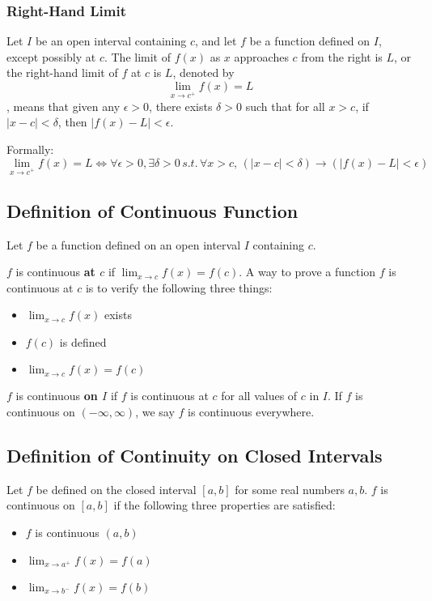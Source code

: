 \documentclass[12pt]{article}
\begin{document}
\subsubsection{Right-Hand Limit}
Let $I$ be an open interval containing $c$, and let $f$ be a function defined on $I$, except possibly at $c$. The limit of $f(x)$ as $x$ approaches $c$ from the right is $L$, or the right-hand limit of $f$ at $c$ is $L$, denoted by $$\lim_{x \rightarrow c^+} f(x) = L$$, means that given any $\epsilon > 0$, there exists $\delta > 0$ such that for all $x > c$, if $|x - c| < \delta$, then $|f(x) - L| < \epsilon$. 

Formally: $$\lim_{x \rightarrow c^+}f(x) = L \Longleftrightarrow \forall \epsilon > 0, \exists \delta > 0 \, s.t. \, \forall x > c, \, (|x-c| < \delta) \rightarrow (|f(x)-L| < \epsilon)$$

\subsection{Definition of Continuous Function}

Let $f$ be a function defined on an open interval $I$ containing $c$. 

$f$ is continuous \textbf{at $c$} if $\lim_{x \rightarrow c} f(x) = f(c)$. A way to prove a function $f$ is continuous at $c$ is to verify the following three things:

\begin{itemize}[noitemsep, nolistsep]
    \item $\lim_{x\rightarrow c} f(x)$ exists
    \item $f(c)$ is defined
    \item $\lim_{x \rightarrow c} f(x) = f(c)$
\end{itemize}

$f$ is continuous \textbf{on $I$} if $f$ is continuous at $c$ for all values of $c$ in $I$. If $f$ is continuous on $(-\infty, \infty)$, we say $f$ is continuous everywhere. 

\subsection{Definition of Continuity on Closed Intervals}

Let $f$ be defined on the closed interval $[a,b]$ for some real numbers $a,b$. $f$ is continuous on $[a,b]$ if the following three properties are satisfied:
\begin{itemize}[noitemsep, nolistsep]
    \item $f$ is continuous $(a,b)$
    \item $\lim_{x \rightarrow a^+} f(x) = f(a)$
    \item $\lim_{x \rightarrow b^-} f(x) = f(b)$
\end{itemize}
\end{document}
